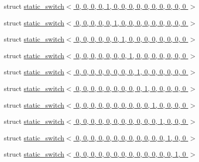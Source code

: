 \begin{DoxyCompactItemize}
\item 
struct \hyperlink{structdlib_1_1static__switch_3_010_00_010_00_010_00_010_00_011_00_010_00_010_00_010_00_010_00_01ff4b50cffbfc7efeb2ebcd8ac49664ca}{static\_\-switch$<$ 0, 0, 0, 0, 1, 0, 0, 0, 0, 0, 0, 0, 0, 0, 0 $>$}
\item 
struct \hyperlink{structdlib_1_1static__switch_3_010_00_010_00_010_00_010_00_010_00_011_00_010_00_010_00_010_00_01065a8f5a38c76e0fbec03f2ecf64307a}{static\_\-switch$<$ 0, 0, 0, 0, 0, 1, 0, 0, 0, 0, 0, 0, 0, 0, 0 $>$}
\item 
struct \hyperlink{structdlib_1_1static__switch_3_010_00_010_00_010_00_010_00_010_00_010_00_011_00_010_00_010_00_01f96a27221d42a17b5e8ff3b09c0ae4ae}{static\_\-switch$<$ 0, 0, 0, 0, 0, 0, 1, 0, 0, 0, 0, 0, 0, 0, 0 $>$}
\item 
struct \hyperlink{structdlib_1_1static__switch_3_010_00_010_00_010_00_010_00_010_00_010_00_010_00_011_00_010_00_0105236f4c56e9666de491dbb566b29360}{static\_\-switch$<$ 0, 0, 0, 0, 0, 0, 0, 1, 0, 0, 0, 0, 0, 0, 0 $>$}
\item 
struct \hyperlink{structdlib_1_1static__switch_3_010_00_010_00_010_00_010_00_010_00_010_00_010_00_010_00_011_00_010dd8c605dbfd043e236f91723a992215}{static\_\-switch$<$ 0, 0, 0, 0, 0, 0, 0, 0, 1, 0, 0, 0, 0, 0, 0 $>$}
\item 
struct \hyperlink{structdlib_1_1static__switch_3_010_00_010_00_010_00_010_00_010_00_010_00_010_00_010_00_010_00_011e8c10a795cabaf3f5d590d7d2ed509c}{static\_\-switch$<$ 0, 0, 0, 0, 0, 0, 0, 0, 0, 1, 0, 0, 0, 0, 0 $>$}
\item 
struct \hyperlink{structdlib_1_1static__switch_3_010_00_010_00_010_00_010_00_010_00_010_00_010_00_010_00_010_00_0145cbcc58af0c0409c47cc48fc11394ec}{static\_\-switch$<$ 0, 0, 0, 0, 0, 0, 0, 0, 0, 0, 1, 0, 0, 0, 0 $>$}
\item 
struct \hyperlink{structdlib_1_1static__switch_3_010_00_010_00_010_00_010_00_010_00_010_00_010_00_010_00_010_00_0147e6a475a446e40bfc581407a8174f9f}{static\_\-switch$<$ 0, 0, 0, 0, 0, 0, 0, 0, 0, 0, 0, 1, 0, 0, 0 $>$}
\item 
struct \hyperlink{structdlib_1_1static__switch_3_010_00_010_00_010_00_010_00_010_00_010_00_010_00_010_00_010_00_01de46d05550779d2bbe7720ab7bfdb3cc}{static\_\-switch$<$ 0, 0, 0, 0, 0, 0, 0, 0, 0, 0, 0, 0, 1, 0, 0 $>$}
\item 
struct \hyperlink{structdlib_1_1static__switch_3_010_00_010_00_010_00_010_00_010_00_010_00_010_00_010_00_010_00_016cef4822784544663fb033f63ec96728}{static\_\-switch$<$ 0, 0, 0, 0, 0, 0, 0, 0, 0, 0, 0, 0, 0, 1, 0 $>$}

\end{DoxyCompactItemize}
